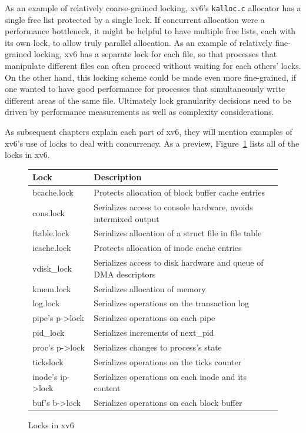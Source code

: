 As an example of relatively coarse-grained locking, xv6's
\lstinline{kalloc.c}
allocator has a single free list protected by a single
lock. If concurrent allocation were a performance bottleneck,
it might be helpful to have multiple free lists, each with
its own lock, to allow truly parallel allocation.
As an example of relatively fine-grained locking, xv6
has a separate lock for each file, so that processes that
manipulate different files can often proceed without waiting
for each others' locks. On the other hand, this locking
scheme could be made even more fine-grained, if one wanted
to have good performance for processes that simultaneously
write different areas of the same file.
Ultimately lock granularity decisions need to be driven
by performance measurements as well as complexity considerations.

As subsequent chapters explain each part of xv6, they
will mention examples of xv6's use of locks
to deal with concurrency.
As a preview,
Figure~\ref{fig:locktable}
lists all of the locks in xv6.

\begin{figure}[t]
\center
\begin{tabular}{ll}
{\bf Lock} & {\bf Description} \\
\midrule
bcache.lock & Protects allocation of block buffer cache entries \\
cons.lock & Serializes access to console hardware, avoids intermixed output \\
ftable.lock & Serializes allocation of a struct file in file table \\
icache.lock & Protects allocation of inode cache entries \\
vdisk\_lock & Serializes access to disk hardware and queue of DMA descriptors \\
kmem.lock & Serializes allocation of memory \\
log.lock & Serializes operations on the transaction log \\
pipe's p->lock & Serializes operations on each pipe \\
pid\_lock & Serializes increments of next\_pid \\
proc's p->lock & Serializes changes to process's state \\
tickslock & Serializes operations on the ticks counter \\
inode's ip->lock & Serializes operations on each inode and its content \\
buf's b->lock & Serializes operations on each block buffer \\
\end{tabular}
\caption{Locks in xv6}
\label{fig:locktable}
\end{figure}
